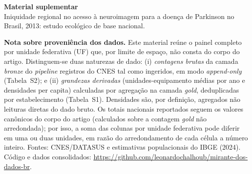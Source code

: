 \documentclass[11pt,a4paper]{article}
\begin{document}
{\large\bfseries Material suplementar}\\[2pt]
{\small Iniquidade regional no acesso à neuroimagem para a doença de
Parkinson no Brasil, 2013: estudo ecológico de base
nacional.}

\vspace{6pt}
\textbf{Nota sobre proveniência dos dados.} Este material reúne o
painel completo por unidade federativa (UF) que, por limite de espaço,
não consta do corpo do artigo. Distinguem-se duas naturezas de dado:
(i) \emph{contagens brutas} da camada \emph{bronze} do
\textit{pipeline} \textemdash{} registros do CNES tal como ingeridos,
em modo \emph{append-only} (Tabela~S2); e (ii) \emph{grandezas
derivadas} (unidades-equipamento médias por ano e densidades per
capita) calculadas por agregação na camada \emph{gold}, deduplicadas
por estabelecimento (Tabela~S1). Densidades são, por definição,
agregados \textemdash{} não leituras diretas do dado bruto. Os totais
nacionais reportados seguem os valores canônicos do corpo do artigo
(calculados sobre a contagem \textit{gold} não arredondada); por isso,
a soma das colunas por unidade federativa pode diferir em uma ou duas
unidades, em razão do arredondamento de cada célula a número inteiro.
Fontes: CNES/DATASUS e estimativas populacionais do IBGE (2024). Código
e dados consolidados:
\url{https://github.com/leonardochalhoub/mirante-dos-dados-br}.
\end{document}
